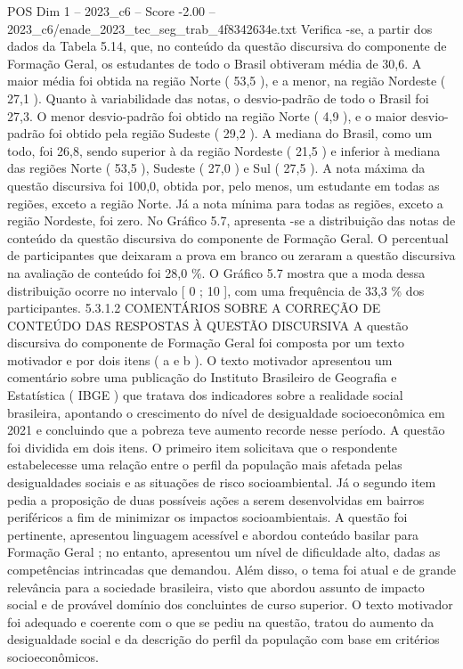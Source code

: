 \begin{textsample}{POS Dim 1 – 2023\_c6 – Score -2.00 – 2023\_c6/enade\_2023\_tec\_seg\_trab\_4f8342634e.txt}
Verifica -se, a partir dos dados da Tabela 5.14, que, no conteúdo da questão discursiva do componente de Formação Geral, os estudantes de todo o Brasil obtiveram média de 30,6.
A maior média foi obtida na região Norte ( 53,5 ), e a menor, na região Nordeste ( 27,1 ).
Quanto à variabilidade das notas, o desvio-padrão de todo o Brasil foi 27,3.
O menor desvio-padrão foi obtido na região Norte ( 4,9 ), e o maior desvio-padrão foi obtido pela região Sudeste ( 29,2 ).
A mediana do Brasil, como um todo, foi 26,8, sendo superior à da região Nordeste ( 21,5 ) e inferior à mediana das regiões Norte ( 53,5 ), Sudeste ( 27,0 ) e Sul ( 27,5 ).
A nota máxima da questão discursiva foi 100,0, obtida por, pelo menos, um estudante em todas as regiões, exceto a região Norte.
Já a nota mínima para todas as regiões, exceto a região Nordeste, foi zero.
No Gráfico 5.7, apresenta -se a distribuição das notas de conteúdo da questão discursiva do componente de Formação Geral.
O percentual de participantes que deixaram a prova em branco ou zeraram a questão discursiva na avaliação de conteúdo foi 28,0 \%.
O Gráfico 5.7 mostra que a moda dessa distribuição ocorre no intervalo [ 0 ; 10 ], com uma frequência de 33,3 \% dos participantes. 5.3.1.2 COMENTÁRIOS SOBRE A CORREÇÃO DE CONTEÚDO DAS RESPOSTAS À QUESTÃO DISCURSIVA A questão discursiva do componente de Formação Geral foi composta por um texto motivador e por dois itens ( a e b ).
O texto motivador apresentou um comentário sobre uma publicação do Instituto Brasileiro de Geografia e Estatística ( IBGE ) que tratava dos indicadores sobre a realidade social brasileira, apontando o crescimento do nível de desigualdade socioeconômica em 2021 e concluindo que a pobreza teve aumento recorde nesse período.
A questão foi dividida em dois itens.
O primeiro item solicitava que o respondente estabelecesse uma relação entre o perfil da população mais afetada pelas desigualdades sociais e as situações de risco socioambiental.
Já o segundo item pedia a proposição de duas possíveis ações a serem desenvolvidas em bairros periféricos a fim de minimizar os impactos socioambientais.
A questão foi pertinente, apresentou linguagem acessível e abordou conteúdo basilar para Formação Geral ; no entanto, apresentou um nível de dificuldade alto, dadas as competências intrincadas que demandou.
Além disso, o tema foi atual e de grande relevância para a sociedade brasileira, visto que abordou assunto de impacto social e de provável domínio dos concluintes de curso superior.
O texto motivador foi adequado e coerente com o que se pediu na questão, tratou do aumento da desigualdade social e da descrição do perfil da população com base em critérios socioeconômicos.

\end{textsample}

